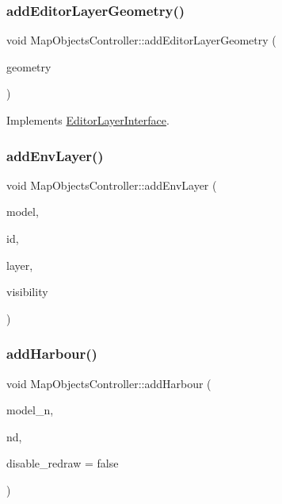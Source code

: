 \subsubsection{\texorpdfstring{addEditorLayerGeometry()}{addEditorLayerGeometry()}}
{\footnotesize\ttfamily void Map\+Objects\+Controller\+::add\+Editor\+Layer\+Geometry (\begin{DoxyParamCaption}\item[{std\+::shared\+\_\+ptr$<$ qmapcontrol\+::\+Geometry $>$}]{geometry }\end{DoxyParamCaption})\hspace{0.3cm}{\ttfamily [virtual]}}



Implements \mbox{\hyperlink{class_editor_layer_interface_a44cbc096e8342a774201a2a08cfb180a}{Editor\+Layer\+Interface}}.

\mbox{\label{class_map_objects_controller_ab78423edafb2d56632a11e5ec212d474}} 
\subsubsection{\texorpdfstring{addEnvLayer()}{addEnvLayer()}}
{\footnotesize\ttfamily void Map\+Objects\+Controller\+::add\+Env\+Layer (\begin{DoxyParamCaption}\item[{int}]{model,  }\item[{int}]{id,  }\item[{std\+::shared\+\_\+ptr$<$ Layer $>$}]{layer,  }\item[{bool}]{visibility }\end{DoxyParamCaption})\hspace{0.3cm}{\ttfamily [protected]}}

\mbox{\label{class_map_objects_controller_a55da86224f6f8c6cfde8767b1e0d1a36}} 
\subsubsection{\texorpdfstring{addHarbour()}{addHarbour()}}
{\footnotesize\ttfamily void Map\+Objects\+Controller\+::add\+Harbour (\begin{DoxyParamCaption}\item[{int}]{model\+\_\+n,  }\item[{std\+::shared\+\_\+ptr$<$ \mbox{\hyperlink{class_harbour_data}{Harbour\+Data}} $>$}]{nd,  }\item[{bool}]{disable\+\_\+redraw = {\ttfamily false} }\end{DoxyParamCaption})}

